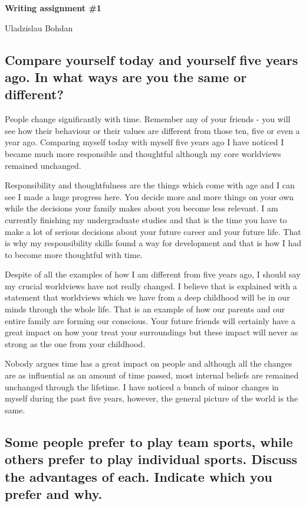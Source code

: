 \documentclass{article}
\begin{document}
{\Large

\textbf{Writing assignment \#1}

Uladzislau Bohdan

}

\vspace{10mm}

\subsection*{Compare yourself today and yourself five years ago. In what ways
are you the same or different?}

People change significantly with time. Remember any of your friends - you will
see how their behaviour or their values are different from those ten, five or
even a year ago. Comparing myself today with myself five years ago I have
noticed I became much more responsible and thoughtful although my core
worldviews remained unchanged.

Responsibility and thoughtfulness are the things which come with age and I can
see I made a huge progress here. You decide more and more things on
your own while the decisions your family makes about you become less relevant.
I am currently finishing my undergraduate studies and that is the time you
have to make a lot of serious decisions about your future career and your future
life. That is why my responsibility skills found a way for development and
that is how I had to become more thoughtful with time.

Despite of all the examples of how I am different from five years ago, I should
say my crucial worldviews have not really changed. I believe that is explained
with a statement that worldviews which we have from a deep childhood
will be in our minds through the whole life. That is an example of how our
parents and our entire family are forming our conscious. Your future friends
will certainly have a great impact on how your treat your surroundings but
these impact will never as strong as the one from your childhood.

Nobody argues time has a great impact on people and although all the changes
are as influential as an amount of time passed, most internal beliefs are remained
unchanged through the lifetime. I have noticed a bunch of minor changes in myself
during the past five years, however, the general picture of the world is the same.

\subsection*{Some people prefer to play team sports, while others prefer to play
individual sports. Discuss the advantages of each. Indicate which you prefer
and why.}
\end{document}
